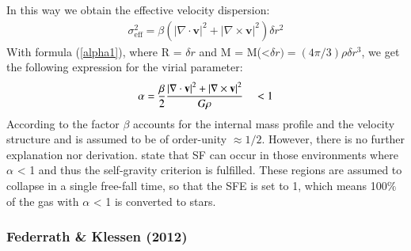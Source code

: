 \documentclass{aa}
\begin{document}
In this way we obtain the effective velocity dispersion:
\begin{align} \label{vdisp_eff}
    \sigma_{\mathrm{eff}}^2 = \beta (\left\vert\nabla \cdot \textbf{v} \right\vert^2+\left\vert\nabla \times \textbf{v} \right\vert^2) \delta r^2
\end{align}
With formula (\ref{alpha1}), where R = $\delta r$ and M = M(<$\delta r) = (4\pi/3)\rho \delta r^3$, we get the following expression for the virial parameter:
\begin{align}
\label{eq: alpha_hop}
    \alpha= \frac{\beta}{2} \frac{\left\vert\nabla \cdot \textbf v \right\vert^2+\left\vert\nabla \times \textbf v \right\vert^2}{G\rho} \quad < 1
\end{align}
According to \cite{Hopkins_2013} the factor $\beta$ accounts for the internal mass profile and the velocity structure and is assumed to be of order-unity $\approx 1/2$. However, there is no further explanation nor derivation.
\cite{Hopkins_2013} state that SF can occur in those environments where $\alpha$ < 1 and thus the self-gravity criterion is fulfilled. These regions are assumed to collapse in a single free-fall time, so that the SFE is set to 1, which means 100$\%$ of the gas with $\alpha$ < 1 is converted to stars.

\subsubsection{Federrath \& Klessen (2012)}
\end{document}
